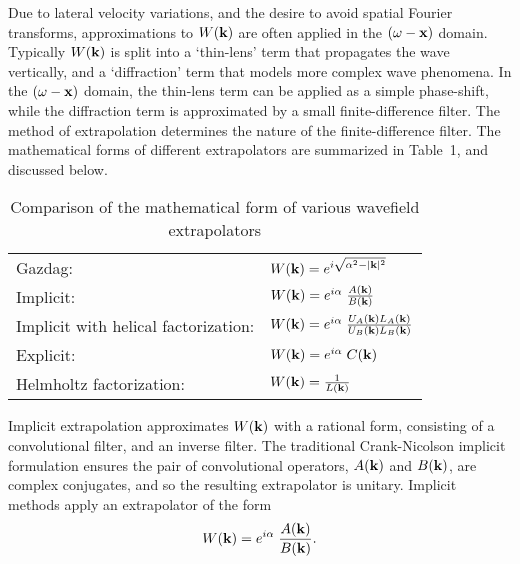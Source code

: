 \par
Due to lateral velocity variations, and the desire to avoid spatial
Fourier transforms, approximations to $W({\bf k})$ are often applied
in the $(\omega-{\bf x})$ domain. 
Typically $W({\bf k})$ is split into a `thin-lens' term that propagates the
wave vertically, and a `diffraction' term that models more complex
wave phenomena.  In the $(\omega-{\bf x})$ domain, the thin-lens term
can be applied as a simple phase-shift, while the diffraction term is
approximated by a small finite-difference filter.  The method of
extrapolation determines the nature of the finite-difference
filter. 
The mathematical forms of different extrapolators are summarized in
Table~1, and discussed below.
\begin{table} \begin{center}
\begin{tabular}{||ll||} \hline
Gazdag:   & $W({\bf k}) = e^{i \sqrt{\alpha^2-|{\bf k}|^2}}$
\rule[-.3cm]{0cm}{.9cm} \\ 
Implicit: & $W({\bf k}) = e^{i\alpha} \;
\frac{A({\bf k})}{B({\bf k})}$  
\rule[-.3cm]{0cm}{.9cm} \\
Implicit with helical factorization: & $W({\bf k}) = e^{i\alpha} \; 
\frac{U_A({\bf k}) L_A({\bf k})}{U_B({\bf k})L_B({\bf k})}$  
\rule[-.3cm]{0cm}{.9cm}  \\ 
Explicit: & $W({\bf k}) = e^{i\alpha} \; C({\bf k})$ 
\rule[-.3cm]{0cm}{.9cm} \\
Helmholtz factorization: & $W({\bf k}) =  \frac{1}{L({\bf k})}$
\rule[-.3cm]{0cm}{.9cm} \\ \hline
\end{tabular} \end{center}
\caption{Comparison of the mathematical form of various wavefield
extrapolators} 
\end{table}

\par
Implicit extrapolation approximates $W({\bf k})$ with a rational form,
consisting of a convolutional filter, and an inverse filter.
The traditional Crank-Nicolson implicit formulation ensures the pair
of convolutional operators, $A({\bf k})$ and $B({\bf k})$, are complex
conjugates, and so the resulting extrapolator is unitary. 
Implicit methods apply an extrapolator of the form
\begin{equation} \label{eqn:impextrap}
W({\bf k})=e^{i\alpha} \;\frac{A({\bf k})}{B({\bf k})}.
\end{equation}

